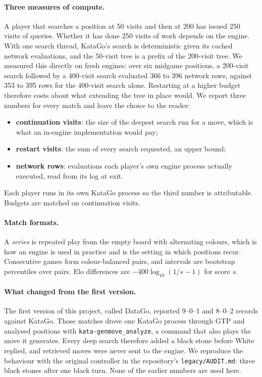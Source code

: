 \paragraph{Three measures of compute.}
A player that searches a position at 50 visits and then at 200 has issued 250 visits of queries. Whether it has done 250 visits of work depends on the engine. With one search thread, KataGo's search is deterministic given its cached network evaluations, and the 50-visit tree is a prefix of the 200-visit tree. We measured this directly on fresh engines: over six midgame positions, a 200-visit search followed by a 400-visit search evaluated 366 to 396 network rows, against 353 to 395 rows for the 400-visit search alone. Restarting at a higher budget therefore costs about what extending the tree in place would. We report three numbers for every match and leave the choice to the reader:
\begin{itemize}
  \item \textbf{continuation visits}: the size of the deepest search run for a move, which is what an in-engine implementation would pay;
  \item \textbf{restart visits}: the sum of every search requested, an upper bound;
  \item \textbf{network rows}: evaluations each player's own engine process actually executed, read from its log at exit.
\end{itemize}
Each player runs in its own KataGo process so the third number is attributable. Budgets are matched on continuation visits.

\paragraph{Match formats.}
A \emph{series} is repeated play from the empty board with alternating colours, which is how an engine is used in practice and is the setting in which positions recur. Consecutive games form colour-balanced pairs, and intervals are bootstrap percentiles over pairs. Elo differences are $-400\log_{10}(1/s-1)$ for score $s$.

\paragraph{What changed from the first version.}
The first version of this project, called DataGo, reported 9--0--1 and 8--0--2 records against KataGo. Those matches drove one KataGo process through GTP and analysed positions with \texttt{kata-genmove\_analyze}, a command that also plays the move it generates. Every deep search therefore added a black stone before White replied, and retrieved moves were never sent to the engine. We reproduce the behaviour with the original controller in the repository's \texttt{legacy/AUDIT.md}: three black stones after one black turn. None of the earlier numbers are used here.
